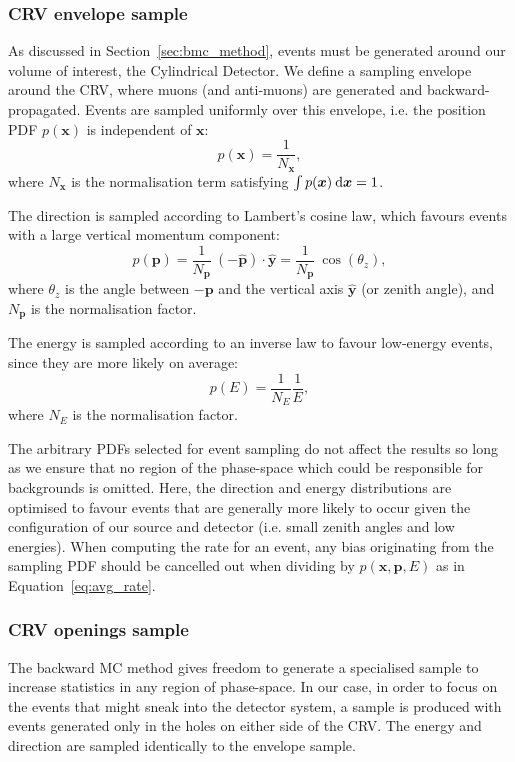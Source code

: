 \subsubsection{CRV envelope sample}
As discussed in Section~\ref{sec:bmc_method}, events must be generated around
our volume of interest, the Cylindrical Detector. We define a sampling
envelope around the CRV, where muons (and anti-muons) are generated and
backward-propagated. Events are sampled uniformly over this
envelope, i.e. the position PDF $p(\bm{x})$ is independent of $\bm{x}$:
\begin{equation}
p(\bm{x}) = \frac{1}{N_{\bm{x}}},
\end{equation}
where $N_{\bm{x}}$ is the normalisation term satisfying 
$\int p(\bm{x}) \: \textnormal{d}\bm{x} = 1$.

The direction is sampled according to Lambert's cosine law, which favours events
with a large vertical momentum component:
\begin{equation}
p(\bm{p}) = 
    \frac{1}{N_{\bm{p}}} \ (-\hat{\bm{p}}) \cdot \hat{\bm{y}} = 
    \frac{1}{N_{\bm{p}}}\:\cos(\theta_z),
\end{equation}
where $\theta_z$ is the angle between $-\bm{p}$ and the vertical axis $\hat{\bm{y}}$
(or zenith angle), and $N_{\bm{p}}$ is the normalisation factor. 

The energy is sampled according to an inverse law to
favour low-energy events, since they are more likely on average:
\begin{equation}
p(E) = \frac{1}{N_E}  \frac{1}{E},
\end{equation}
where $N_E$ is the normalisation factor. 

The arbitrary PDFs selected for event sampling do not affect the results so long
as we ensure that no region of the phase-space which could be responsible for
backgrounds is omitted. Here, the direction and energy distributions are
optimised to favour events that are generally more likely to
occur given the configuration of our source and detector (i.e. small zenith
angles and low energies). When computing the rate for an event, any bias
originating from the sampling PDF should be cancelled out when dividing by
$p(\bm{x}, \bm{p}, E)$ as in Equation~\ref{eq:avg_rate}.



\subsubsection{CRV openings sample}
The backward MC method gives freedom to generate a specialised sample to
increase statistics in any region of phase-space. In our case, in order to focus
on the events that might sneak into the detector system, a sample is produced
with events generated only in the holes on either side of the CRV. The energy
and direction are sampled identically to the envelope sample.

